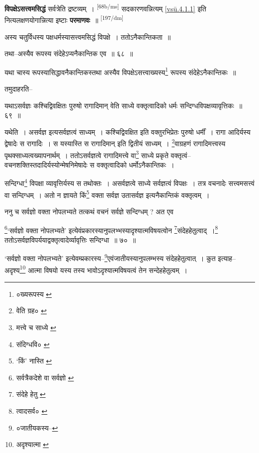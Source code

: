 \documentclass[article,12pt,a4paper]{memoir}
\begin{document}
	  \pstart \textbf{विपक्षेऽसत्त्वमसिद्धं} सर्वत्रेति द्रष्टव्यम् । \leavevmode\textsuperscript{\rmlatinfont\tiny [68b/ms]} सदकारणवन्नित्यम् \cref{vsū.4.1.1} इति नित्यलक्षणयोगान्नित्या इष्टाः \textbf{परमाणवः} ॥
	\pend
      \leavevmode\textsuperscript{\rmlatinfont\tiny [197/dm]}

	  \pstart अस्य चतुर्विधस्य पक्षधर्मस्यासत्त्वमसिद्धं विपक्षे । ततोऽनैकान्तिकता ॥
	\pend
       

	  \pstart तथा--अस्यैव रूपस्य संदेहेऽप्यनैकान्तिक एव ॥ ६८ ॥
	\pend
       

	  \pstart यथा चास्य रूपस्यासिद्धावनैकान्तिकस्तथा अस्यैव विपक्षेऽसत्त्वाख्यस्य\footnote{०ख्यरूपस्य \cite{dp-msC}} रूपस्य संदेहेऽनैकान्तिकः ॥
	\pend
       

	  \pstart तमुदाहरति--
	\pend
       

	  \pstart यथाऽसर्वज्ञः कश्चिद्विवक्षितः पुरुषो रागादिमान् वेति साध्ये वक्तृत्वादिको धर्मः सन्दिग्धविपक्षव्यावृत्तिकः ॥ ६९ ॥
	\pend
       

	  \pstart यथेति । असर्वज्ञ इत्यसर्वज्ञत्वं साध्यम् । कश्चिद्विवक्षित इति वक्तुरभिप्रेतः पुरुषो धर्मीं । रागा आदिर्यस्य द्वेषादेः स रागादिः । स यस्यास्ति स रागादिमान् इति द्वितीयं साध्यम् । \footnote{वेति ग्रह० \cite{dp-msC} \cite{dp-msD}}वाग्रहणं रागादिमत्त्वस्य पृथक्साध्यत्वख्यापनार्थम् । ततोऽसर्वज्ञत्वे रागादिमत्त्वे वा\footnote{मत्त्वे च साध्ये \cite{dp-msC}} साध्ये प्रकृते वक्तृत्वं--वचनशक्तिस्तदादिर्यस्योन्मेषनिमेषादेः स वक्तृत्वादिको धर्मोऽनैकान्तिकः ।
	\pend
       

	  \pstart सन्दिग्धा\footnote{संदिग्धवि० \cite{dp-msB}} विपक्षा व्यावृत्तिर्यस्य स तथोक्तः । असर्वज्ञत्वे साध्ये सर्वज्ञत्वं विपक्षः । तत्र वचनादेः सत्त्वमसत्त्वं वा सन्दिग्धम् । अतो न ज्ञायते किं\footnote{‘किं’ नास्ति \cite{dp-msA} \cite{dp-msB} \cite{dp-msD} \cite{dp-edP} \cite{dp-edH} \cite{dp-edE} \cite{dp-edN}} वक्ता सर्वज्ञ उतासर्वज्ञ इत्यनैकान्तिकं वक्तृत्वम् ।
	\pend
       

	  \pstart ननु च सर्वज्ञो वक्ता नोपलभ्यते तत्कथं वचनं सर्वज्ञे सन्दिग्धम् ? अत एव
	\pend
       

	  \pstart \footnote{सर्वत्रैकदेशे वा सर्वज्ञो \cite{dp-msB} \cite{dp-edP} \cite{dp-edH}}‘सर्वज्ञो वक्ता नोपलभ्यते’ इत्येवंप्रकारस्यानुपलभ्भस्यादृश्यात्मविषयत्वोन \footnote{संदेहे हेतु \cite{dp-msB} \cite{dp-edP} \cite{dp-edH} \cite{dp-edE}}संदेहहेतुत्वाद् ।\footnote{त्वादसर्व० \cite{dp-msB} \cite{dp-msD} \cite{dp-edP} \cite{dp-edH} \cite{dp-edE}} ततोऽसर्वज्ञविपर्ययाद्वक्तृत्वादेर्व्यावृत्तिः सन्दिग्धा ॥ ७० ॥
	\pend
       

	  \pstart ‘सर्वज्ञो वक्ता नोपलभ्यते’ इत्येवम्प्रकारस्य--\footnote{०जातीयकस्य--\cite{dp-msB}}एवंजातीयस्यानुपलम्भस्य संदेहहेतुत्वात् । कुत इत्याह--अदृश्य\footnote{अदृश्यात्मा \cite{dp-msA} \cite{dp-msB} \cite{dp-edP} \cite{dp-edH} \cite{dp-edE} \cite{dp-edN}} आत्मा विषयो यस्य तस्य भावोऽदृश्यात्मविषयत्वं तेन सन्देहहेतुत्वम् ।
	\pend
      
\end{document}

